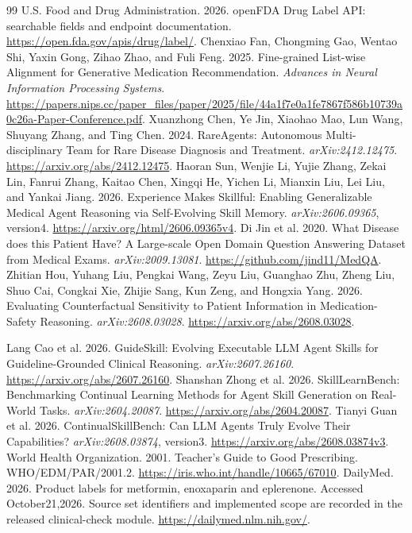 \begin{thebibliography}{99}
 U.S. Food and Drug Administration. 2026. openFDA Drug Label API: searchable fields and endpoint documentation. \url{https://open.fda.gov/apis/drug/label/}.
 Chenxiao Fan, Chongming Gao, Wentao Shi, Yaxin Gong, Zihao Zhao, and Fuli Feng. 2025. Fine-grained List-wise Alignment for Generative Medication Recommendation. \emph{Advances in Neural Information Processing Systems}. \url{https://papers.nips.cc/paper_files/paper/2025/file/44a1f7e0a1fe7867f586b10739a0c26a-Paper-Conference.pdf}.
 Xuanzhong Chen, Ye Jin, Xiaohao Mao, Lun Wang, Shuyang Zhang, and Ting Chen. 2024. RareAgents: Autonomous Multi-disciplinary Team for Rare Disease Diagnosis and Treatment. \emph{arXiv:2412.12475}. \url{https://arxiv.org/abs/2412.12475}.
 Haoran Sun, Wenjie Li, Yujie Zhang, Zekai Lin, Fanrui Zhang, Kaitao Chen, Xingqi He, Yichen Li, Mianxin Liu, Lei Liu, and Yankai Jiang. 2026. Experience Makes Skillful: Enabling Generalizable Medical Agent Reasoning via Self-Evolving Skill Memory. \emph{arXiv:2606.09365}, version4. \url{https://arxiv.org/html/2606.09365v4}.
 Di Jin et al. 2020. What Disease does this Patient Have? A Large-scale Open Domain Question Answering Dataset from Medical Exams. \emph{arXiv:2009.13081}. \url{https://github.com/jind11/MedQA}.
 Zhitian Hou, Yuhang Liu, Pengkai Wang, Zeyu Liu, Guanghao Zhu, Zheng Liu, Shuo Cai, Congkai Xie, Zhijie Sang, Kun Zeng, and Hongxia Yang. 2026. Evaluating Counterfactual Sensitivity to Patient Information in Medication-Safety Reasoning. \emph{arXiv:2608.03028}. \url{https://arxiv.org/abs/2608.03028}.

 Lang Cao et al. 2026. GuideSkill: Evolving Executable LLM Agent Skills for Guideline-Grounded Clinical Reasoning. \emph{arXiv:2607.26160}. \url{https://arxiv.org/abs/2607.26160}.
 Shanshan Zhong et al. 2026. SkillLearnBench: Benchmarking Continual Learning Methods for Agent Skill Generation on Real-World Tasks. \emph{arXiv:2604.20087}. \url{https://arxiv.org/abs/2604.20087}.
 Tianyi Guan et al. 2026. ContinualSkillBench: Can LLM Agents Truly Evolve Their Capabilities? \emph{arXiv:2608.03874}, version3. \url{https://arxiv.org/abs/2608.03874v3}.
 World Health Organization. 2001. Teacher's Guide to Good Prescribing. WHO/EDM/PAR/2001.2. \url{https://iris.who.int/handle/10665/67010}.
 DailyMed. 2026. Product labels for metformin, enoxaparin and eplerenone. Accessed October21,2026. Source set identifiers and implemented scope are recorded in the released clinical-check module. \url{https://dailymed.nlm.nih.gov/}.
\end{thebibliography}
\appendix
